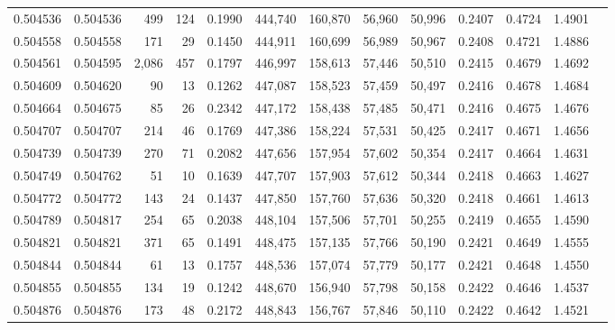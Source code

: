 \begin{tabular}{rrrrrrrrrrrrr}
0.504536 & 0.504536 &   499 &   124 &                                     0.1990 & 444,740 & 160,870 &  56,960 &  50,996 & 0.2407 & 0.4724 & 1.4901 \\
0.504558 & 0.504558 &   171 &    29 &                                     0.1450 & 444,911 & 160,699 &  56,989 &  50,967 & 0.2408 & 0.4721 & 1.4886 \\
0.504561 & 0.504595 & 2,086 &   457 &                                     0.1797 & 446,997 & 158,613 &  57,446 &  50,510 & 0.2415 & 0.4679 & 1.4692 \\
0.504609 & 0.504620 &    90 &    13 &                                     0.1262 & 447,087 & 158,523 &  57,459 &  50,497 & 0.2416 & 0.4678 & 1.4684 \\
0.504664 & 0.504675 &    85 &    26 &                                     0.2342 & 447,172 & 158,438 &  57,485 &  50,471 & 0.2416 & 0.4675 & 1.4676 \\
0.504707 & 0.504707 &   214 &    46 &                                     0.1769 & 447,386 & 158,224 &  57,531 &  50,425 & 0.2417 & 0.4671 & 1.4656 \\
0.504739 & 0.504739 &   270 &    71 &                                     0.2082 & 447,656 & 157,954 &  57,602 &  50,354 & 0.2417 & 0.4664 & 1.4631 \\
0.504749 & 0.504762 &    51 &    10 &                                     0.1639 & 447,707 & 157,903 &  57,612 &  50,344 & 0.2418 & 0.4663 & 1.4627 \\
0.504772 & 0.504772 &   143 &    24 &                                     0.1437 & 447,850 & 157,760 &  57,636 &  50,320 & 0.2418 & 0.4661 & 1.4613 \\
0.504789 & 0.504817 &   254 &    65 &                                     0.2038 & 448,104 & 157,506 &  57,701 &  50,255 & 0.2419 & 0.4655 & 1.4590 \\
0.504821 & 0.504821 &   371 &    65 &                                     0.1491 & 448,475 & 157,135 &  57,766 &  50,190 & 0.2421 & 0.4649 & 1.4555 \\
0.504844 & 0.504844 &    61 &    13 &                                     0.1757 & 448,536 & 157,074 &  57,779 &  50,177 & 0.2421 & 0.4648 & 1.4550 \\
0.504855 & 0.504855 &   134 &    19 &                                     0.1242 & 448,670 & 156,940 &  57,798 &  50,158 & 0.2422 & 0.4646 & 1.4537 \\
0.504876 & 0.504876 &   173 &    48 &                                     0.2172 & 448,843 & 156,767 &  57,846 &  50,110 & 0.2422 & 0.4642 & 1.4521 \\

\end{tabular}
